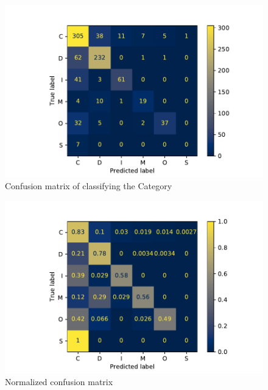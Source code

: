\documentclass[11pt,a4paper]{article}
\begin{document}
\begin{figure}[h]
    \centering
    \includegraphics[width=1.0\columnwidth]{Figures/confusionMatrixCategory.pdf}
    \caption{Confusion matrix of classifying the Category }
    \label{fig:fig3}
\end{figure}

\begin{figure}[h]
    \centering
    \includegraphics[width=1.0\columnwidth]{Figures/confusionMatrixCategoryNormalized.pdf}
    \caption{Normalized confusion matrix}
    \label{fig:fig4}
\end{figure}
\end{document}
